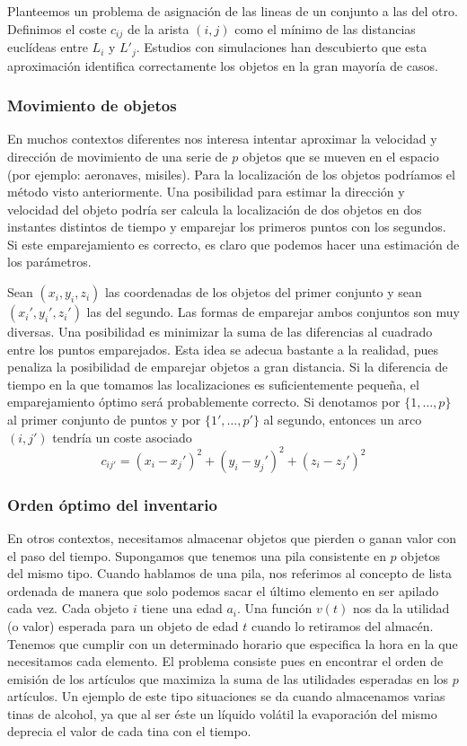 \documentclass[twoside,12pt]{article}
\begin{document}
Planteemos un problema de asignación de las lineas de un conjunto a las del otro. Definimos el coste $c_{ij}$ de la arista $(i,j)$ como el mínimo de las distancias euclídeas entre $L_i$ y $L'_j$. Estudios con simulaciones han descubierto que esta aproximación identifica correctamente los objetos en la gran mayoría de casos.

\subsubsection{Movimiento de objetos}
En muchos contextos diferentes nos interesa intentar aproximar la velocidad y dirección de movimiento de una serie de $p$ objetos que se mueven en el espacio (por ejemplo: aeronaves, misiles). Para la localización de los objetos podríamos el método visto anteriormente.   Una posibilidad para estimar la dirección y velocidad del objeto podría ser calcula la localización de dos objetos en dos instantes distintos de tiempo y emparejar los primeros puntos con los segundos. Si este emparejamiento es correcto, es claro que podemos hacer una estimación de los parámetros. 

Sean $(x_i,y_i,z_i)$ las coordenadas de los objetos del primer conjunto y sean $(x_i',y_i',z_i')$ las del segundo. Las formas de emparejar ambos conjuntos son muy diversas. Una posibilidad es minimizar la suma de las diferencias al cuadrado entre los puntos emparejados. Esta idea se adecua bastante a la realidad, pues penaliza la posibilidad de emparejar objetos a gran distancia. Si la diferencia de tiempo en la que tomamos las localizaciones es suficientemente pequeña, el emparejamiento óptimo será probablemente correcto. Si denotamos por $\{1,\dotsc,p\}$ al primer conjunto de puntos y por $\{1',\dotsc,p'\}$ al segundo, entonces un arco $(i,j')$ tendría un coste asociado 
$$
c_{ij'} = (x_i-x_j')^2+(y_i-y_j')^2+(z_i-z_j')^2
$$

\subsubsection{Orden óptimo del inventario}
En otros contextos, necesitamos almacenar objetos que pierden o ganan valor con el paso del tiempo. Supongamos que tenemos una pila consistente en $p$ objetos del mismo tipo. Cuando hablamos de una pila, nos referimos al concepto de lista ordenada de manera que solo podemos sacar el último elemento en ser apilado cada vez. Cada objeto $i$ tiene una edad $a_i$. Una función $v(t)$ nos da la utilidad (o valor) esperada para un objeto de edad $t$ cuando lo retiramos del almacén. Tenemos que cumplir con un determinado horario que especifica la hora en la que necesitamos cada elemento. El problema consiste pues en encontrar el orden de emisión de los artículos que maximiza la suma de las utilidades esperadas en los $p$ artículos. Un ejemplo de este tipo situaciones se da cuando almacenamos varias tinas de alcohol, ya que al ser éste un líquido volátil la evaporación del mismo deprecia el valor de cada tina con el tiempo.
\end{document}
